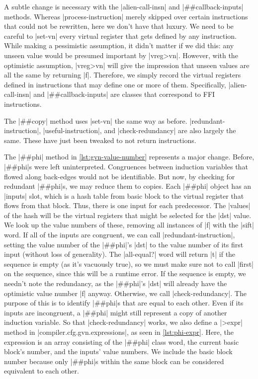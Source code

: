 A subtle change is necessary with the \factor|alien-call-insn| and
\factor|##callback-inputs| methods.  Whereas \factor|process-instruction|
merely skipped over certain instructions that could not be rewritten, here we
don't have that luxury.  We need to be careful to \factor|set-vn| every virtual
register that gets defined by any instruction.  While making a pessimistic
assumption, it didn't matter if we did this: any unseen value would be presumed
important by \factor|vreg>vn|.  However, with the optimistic assumption,
\factor|vreg>vn| will give the impression that unseen values are all the same
by returning \factor|f|.  Therefore, we simply record the virtual registers
defined in instructions that may define one or more of them.  Specifically,
\factor|alien-call-insn| and \factor|##callback-inputs| are classes that
correspond to \gls{FFI} instructions.

The \factor|##copy| method uses \factor|set-vn| the same way as before.
\factor|redundant-instruction|, \factor|useful-instruction|, and
\factor|check-redundancy| are also largely the same.  These have just been
tweaked to not return instructions.


The \factor|##phi| method in \vref{lst:gvn-value-number} represents a major
change. Before, \factor|##phi|s were left uninterpreted.  Congruences between
induction variables that flowed along back-edges would not be identifiable.
But now, by checking for redundant \factor|##phi|s, we may reduce them to
copies.  Each \factor|##phi| object has an \factor|inputs| slot, which is a
hash table from basic block to the virtual register that flows from that block.
Thus, there is one input for each predecessor.  The \factor|values| of the hash
will be the virtual registers that might be selected for the \factor|dst|
value.  We look up the value numbers of these, removing all instances of
\factor|f| with the \factor|sift| word.  If all of the inputs are congruent, we
can call \factor|redundant-instruction|, setting the value number of the
\factor|##phi|'s \factor|dst| to the value number of its first input (without
loss of generality).  The \factor|all-equal?| word will return \factor|t| if
the sequence is empty (as it's vacuously true), so we must make sure not to
call \factor|first| on the sequence, since this will be a runtime error.  If
the sequence is empty, we needn't note the redundancy, as the \factor|##phi|'s
\factor|dst| will already have the optimistic value number \factor|f| anyway.
Otherwise, we call \factor|check-redundancy|.  The purpose of this is to
identify \factor|##phi|s that are equal to each other.  Even if its inputs are
incongruent, a \factor|##phi| might still represent a copy of another induction
variable.  So that \factor|check-redundancy| works, we also define a
\factor|>expr| method in \factor|compiler.cfg.gvn.expressions|, as seen in
\vref{lst:phi-expr}.  Here, the expression is an array consisting of the
\factor|##phi| class word, the current basic block's number, and the inputs'
value numbers.  We include the basic block number because only \factor|##phi|s
within the same block can be considered equivalent to each other.

